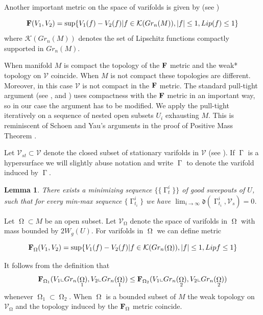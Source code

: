 \documentclass[12pt]{amsart}
\newtheorem{lemma}[theorem]{Lemma}
\DeclareMathOperator{\G}{\Gamma}
\DeclareMathOperator{\Om}{\Omega}
\theoremstyle{definition}
\begin{document}
Another important metric on the space of varifolds is 
given by (see \cite[2.1(19)]{Pi})

$${\bf F}(V_1,V_2) = \sup \{V_1(f)-V_2(f) | f \in \mathcal{K}(Gr_n(M)),
|f| \leq 1, Lip (f) \leq 1\}$$
where $\mathcal{K}(Gr_n(M))$ denotes the set of
Lipschitz functions compactly supported
in $Gr_n(M)$.

When manifold $M$ is compact 
the topology of the ${\bf F}$ metric and
the weak* topology on $\mathcal{V}$ coincide.
When $M$ is not compact these topologies
are different. 
Moreover, in this case $\mathcal{V}$
is not compact in the ${\bf F}$ metric.
The standard pull-tight argument 
(see \cite[Theorem 4.3]{Pi},  \cite[Proposition 4.1]{CD}
 and \cite[Proposition 8.5]{MN1}) uses compactness with 
the ${\bf F}$ metric in an important way, so in our case
the argument has to be modified. 
We apply the pull-tight iteratively 
on a sequence of nested open subsets $U_i$ exhausting $M$.
This is reminiscent of Schoen and Yau's 
arguments in the proof of Positive Mass Theorem \cite{SY}.
 
Let $\mathcal{V}_{st} \subset \mathcal{V}$ denote
the closed subset of stationary varifolds
in $\mathcal{V}$ (see \cite[8.2]{Si}).
If $\G$ is a hypersurface we 
will slightly abuse notation and
write $\G$ to denote the varifold induced by $\G$.

\begin{lemma} \label{pull-tight}
There exists a minimizing sequence
$\{\{ \G_{t}^i \}\}$
of good sweepouts of $U$,
such that for every min-max sequence
$\{ \G_{t_i}^i \}$ we have
$\lim_{i \rightarrow \infty} 
\mathfrak{d}(\G_{t_i}^i, \mathcal{V}_s) = 0$.
\end{lemma}



Let $\Om \subset M$ be an open subset.
Let $\mathcal{V}_{\Om}$ denote the space of varifolds
in $\Om$ with mass bounded by $2W_g(U)$.
For varifolds
in $\Om$ we can define metric

$${\bf F}_{\Om}(V_1, V_2)= \sup \{V_1(f)-V_2(f) | f \in \mathcal{K}(Gr_n(\Om)),
|f| \leq 1, Lip f \leq 1\}$$

It follows from the definition that
$${\bf F}_{\Om_1}(V_1 \llcorner Gr_n(\Om_1), 
V_2 \llcorner Gr_n(\Om_1)) \leq {\bf F}_{\Om_2}(V_1
\llcorner Gr_n(\Om_2), V_2 \llcorner Gr_n(\Om_2))$$
whenever $\Om_1 \subset \Om_2$.
When $\Om$ is a bounded subset of $M$
the weak topology on $\mathcal{V}_{\Om}$ and the topology induced
by the ${\bf F}_{\Om}$ metric coincide.
\end{document}
